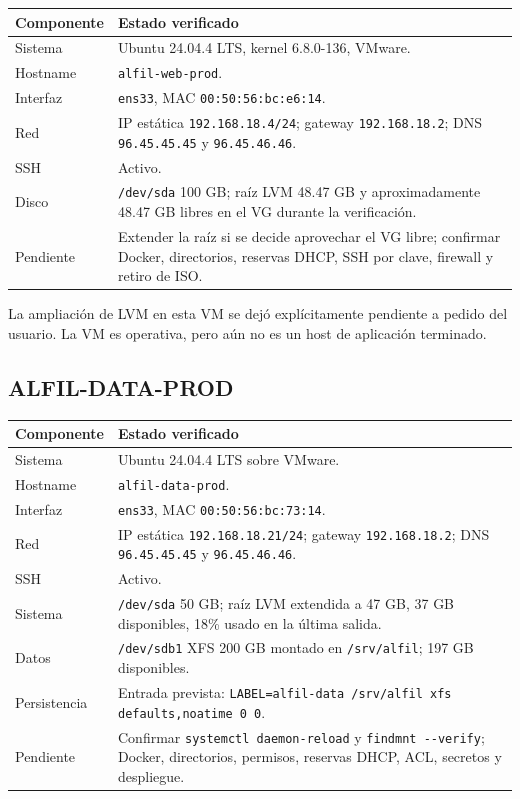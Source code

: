 \documentclass[11pt,a4paper]{article}
\newcommand{\code}[1]{\nolinkurl{#1}}
\begin{document}
\begin{tabularx}{\textwidth}{L{5.0cm}Y}
\toprule
\textbf{Componente} & \textbf{Estado verificado}\\
\midrule
Sistema & Ubuntu 24.04.4 LTS, kernel 6.8.0-136, VMware.\\
Hostname & \code{alfil-web-prod}.\\
Interfaz & \code{ens33}, MAC \code{00:50:56:bc:e6:14}.\\
Red & IP estática \code{192.168.18.4/24}; gateway \code{192.168.18.2}; DNS \code{96.45.45.45} y \code{96.45.46.46}.\\
SSH & Activo.\\
Disco & \code{/dev/sda} 100 GB; raíz LVM 48.47 GB y aproximadamente 48.47 GB libres en el VG durante la verificación.\\
Pendiente & Extender la raíz si se decide aprovechar el VG libre; confirmar Docker, directorios, reservas DHCP, SSH por clave, firewall y retiro de ISO.\\
\bottomrule
\end{tabularx}

La ampliación de LVM en esta VM se dejó explícitamente pendiente a pedido del usuario. La VM es operativa, pero aún no es un host de aplicación terminado.

\subsection{ALFIL-DATA-PROD}

\begin{tabularx}{\textwidth}{L{5.0cm}Y}
\toprule
\textbf{Componente} & \textbf{Estado verificado}\\
\midrule
Sistema & Ubuntu 24.04.4 LTS sobre VMware.\\
Hostname & \code{alfil-data-prod}.\\
Interfaz & \code{ens33}, MAC \code{00:50:56:bc:73:14}.\\
Red & IP estática \code{192.168.18.21/24}; gateway \code{192.168.18.2}; DNS \code{96.45.45.45} y \code{96.45.46.46}.\\
SSH & Activo.\\
Sistema & \code{/dev/sda} 50 GB; raíz LVM extendida a 47 GB, 37 GB disponibles, 18\% usado en la última salida.\\
Datos & \code{/dev/sdb1} XFS 200 GB montado en \code{/srv/alfil}; 197 GB disponibles.\\
Persistencia & Entrada prevista: \code{LABEL=alfil-data /srv/alfil xfs defaults,noatime 0 0}.\\
Pendiente & Confirmar \code{systemctl daemon-reload} y \code{findmnt --verify}; Docker, directorios, permisos, reservas DHCP, ACL, secretos y despliegue.\\
\bottomrule
\end{tabularx}
\end{document}
